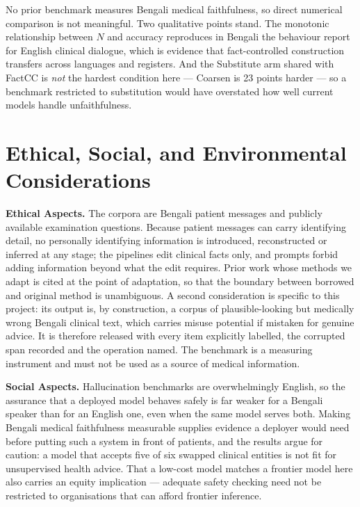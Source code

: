 \documentclass{iutbscthesis}
\begin{document}
No prior benchmark measures Bengali medical faithfulness, so direct numerical comparison is not meaningful. Two qualitative points stand. The monotonic relationship between $N$ and accuracy reproduces in Bengali the behaviour \textcite{bn2025factcontrolled} report for English clinical dialogue, which is evidence that fact-controlled construction transfers across languages and registers. And the Substitute arm shared with FactCC \parencite{kryscinski2020factcc} is \emph{not} the hardest condition here --- Coarsen is 23 points harder --- so a benchmark restricted to substitution would have overstated how well current models handle unfaithfulness.

\chapter{Ethical, Social, and Environmental Considerations} \label{chapter:ethics}

\textbf{Ethical Aspects.} The corpora are Bengali patient messages and publicly available examination questions. Because patient messages can carry identifying detail, no personally identifying information is introduced, reconstructed or inferred at any stage; the pipelines edit clinical facts only, and prompts forbid adding information beyond what the edit requires. Prior work whose methods we adapt \parencite{bn2025factcontrolled, kryscinski2020factcc, adib2026benhallueval} is cited at the point of adaptation, so that the boundary between borrowed and original method is unambiguous. A second consideration is specific to this project: its output is, by construction, a corpus of plausible-looking but medically wrong Bengali clinical text, which carries misuse potential if mistaken for genuine advice. It is therefore released with every item explicitly labelled, the corrupted span recorded and the operation named. The benchmark is a measuring instrument and must not be used as a source of medical information.

\textbf{Social Aspects.} Hallucination benchmarks are overwhelmingly English, so the assurance that a deployed model behaves safely is far weaker for a Bengali speaker than for an English one, even when the same model serves both. Making Bengali medical faithfulness measurable supplies evidence a deployer would need before putting such a system in front of patients, and the results argue for caution: a model that accepts five of six swapped clinical entities is not fit for unsupervised health advice. That a low-cost model matches a frontier model here also carries an equity implication --- adequate safety checking need not be restricted to organisations that can afford frontier inference.
\end{document}
